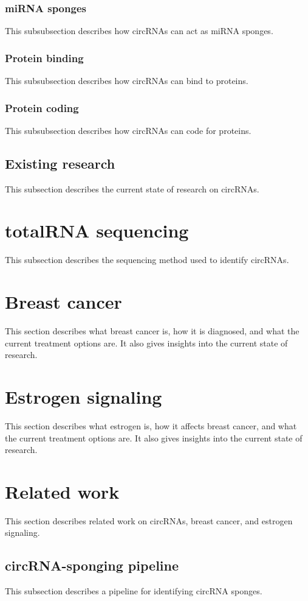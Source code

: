 \subsubsection{miRNA sponges}
This subsubsection describes how circRNAs can act as miRNA sponges.

\subsubsection{Protein binding}
This subsubsection describes how circRNAs can bind to proteins.

\subsubsection{Protein coding}
This subsubsection describes how circRNAs can code for proteins.

\subsection{Existing research}
This subsection describes the current state of research on circRNAs.

\section{totalRNA sequencing}
This subsection describes the sequencing method used to identify circRNAs.

\lipsum[2]

\section{Breast cancer}
This section describes what breast cancer is, how it is diagnosed, and what the current treatment options are.
It also gives insights into the current state of research.

\lipsum[3]

\section{Estrogen signaling}
This section describes what estrogen is, how it affects breast cancer, and what the current treatment options are.
It also gives insights into the current state of research.

\lipsum[4]

\section{Related work}
This section describes related work on circRNAs, breast cancer, and estrogen signaling.

\subsection{circRNA-sponging pipeline}
This subsection describes a pipeline for identifying circRNA sponges.